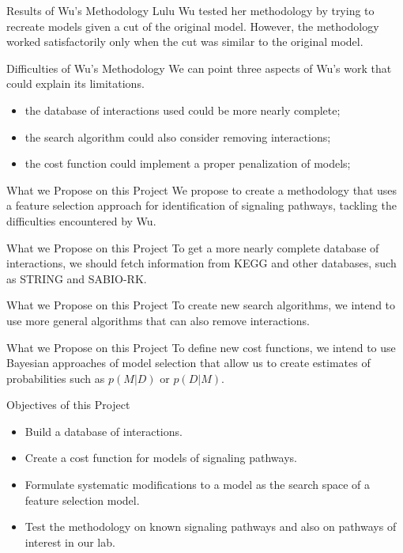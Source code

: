 \documentclass{beamer}
\begin{document}
\begin{frame}{Results of Wu's Methodology}
Lulu Wu tested her methodology by trying to recreate models given a cut
of the original model. \pause However, the methodology worked 
satisfactorily only when the cut was similar to the original model.
\end{frame}


\begin{frame}{Difficulties of Wu's Methodology}
We can point three aspects of Wu's work that could explain its 
limitations.
\begin{itemize}
\pause
\item{the database of interactions used could be more nearly complete;} 
\pause
\item{the search algorithm could also consider removing interactions;}
\pause
\item{the cost function could implement a proper penalization of 
models;}
\end{itemize}
\end{frame}


\begin{frame}{What we Propose on this Project}
We propose to create a methodology that uses a feature selection 
approach for identification of signaling pathways, tackling the 
difficulties encountered by Wu.
\end{frame}


\begin{frame}{What we Propose on this Project}
To get a more nearly complete database of interactions, we should fetch 
information from KEGG and other databases, \pause such as STRING and
SABIO-RK.
\end{frame}


\begin{frame}{What we Propose on this Project}
To create new search algorithms, \pause we intend to use more general
algorithms that can also remove interactions.
\end{frame}


\begin{frame}{What we Propose on this Project}
To define new cost functions, \pause we intend to use Bayesian 
approaches of model selection that allow us to create estimates of 
probabilities such as $p (M | D)$ or $p (D | M)$.
\end{frame}


\begin{frame}{Objectives of this Project}
\begin{itemize}
\pause
\item{Build a database of interactions.}
\pause
\item{Create a cost function for models of signaling pathways.}
\pause
\item{Formulate systematic modifications to a model as the search space
    of a feature selection model.}
\pause
\item{Test the methodology on known signaling pathways and also on 
    pathways of interest in our lab.}
\end{itemize}
\end{frame}
\end{document}
